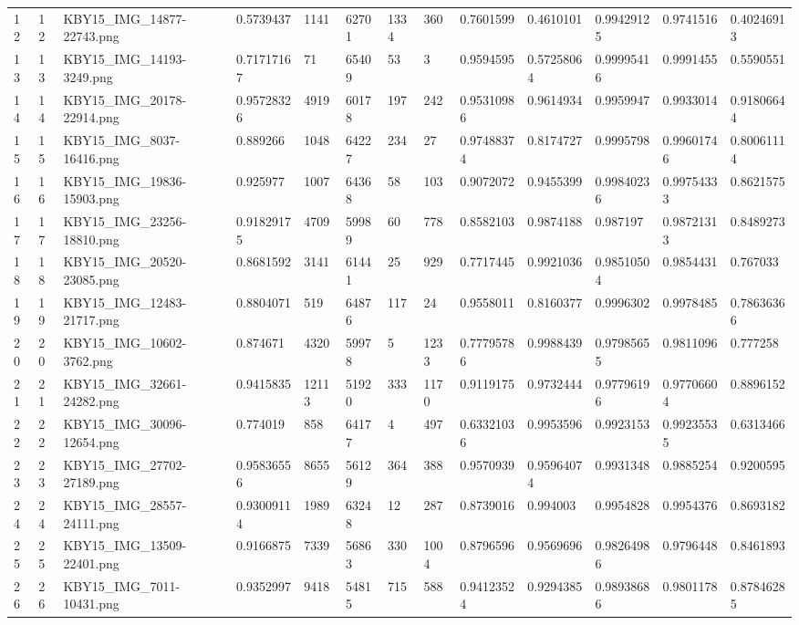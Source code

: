 \documentclass[11pt, a4paper, twoside]{report}
\begin{document}
\begin{longtable}[c]{@{}lllllllllllll@{}}
12 & 12 & KBY15\_IMG\_14877-22743.png & 0.5739437 & 1141 & 62701 & 1334 & 360 & 0.7601599 & 0.4610101 & 0.99429125 & 0.9741516 & 0.40246913 \\
13 & 13 & KBY15\_IMG\_14193-3249.png & 0.71717167 & 71 & 65409 & 53 & 3 & 0.9594595 & 0.57258064 & 0.99995416 & 0.9991455 & 0.5590551 \\
14 & 14 & KBY15\_IMG\_20178-22914.png & 0.95728326 & 4919 & 60178 & 197 & 242 & 0.95310986 & 0.9614934 & 0.9959947 & 0.9933014 & 0.91806644 \\
15 & 15 & KBY15\_IMG\_8037-16416.png & 0.889266 & 1048 & 64227 & 234 & 27 & 0.97488374 & 0.8174727 & 0.9995798 & 0.99601746 & 0.80061114 \\
16 & 16 & KBY15\_IMG\_19836-15903.png & 0.925977 & 1007 & 64368 & 58 & 103 & 0.9072072 & 0.9455399 & 0.99840236 & 0.99754333 & 0.8621575 \\
17 & 17 & KBY15\_IMG\_23256-18810.png & 0.91829175 & 4709 & 59989 & 60 & 778 & 0.8582103 & 0.9874188 & 0.987197 & 0.98721313 & 0.8489273 \\
18 & 18 & KBY15\_IMG\_20520-23085.png & 0.8681592 & 3141 & 61441 & 25 & 929 & 0.7717445 & 0.9921036 & 0.98510504 & 0.9854431 & 0.767033 \\
19 & 19 & KBY15\_IMG\_12483-21717.png & 0.8804071 & 519 & 64876 & 117 & 24 & 0.9558011 & 0.8160377 & 0.9996302 & 0.9978485 & 0.78636366 \\
20 & 20 & KBY15\_IMG\_10602-3762.png & 0.874671 & 4320 & 59978 & 5 & 1233 & 0.77795786 & 0.9988439 & 0.97985655 & 0.9811096 & 0.777258 \\
21 & 21 & KBY15\_IMG\_32661-24282.png & 0.9415835 & 12113 & 51920 & 333 & 1170 & 0.9119175 & 0.9732444 & 0.97796196 & 0.97706604 & 0.8896152 \\
22 & 22 & KBY15\_IMG\_30096-12654.png & 0.774019 & 858 & 64177 & 4 & 497 & 0.63321036 & 0.9953596 & 0.9923153 & 0.99235535 & 0.6313466 \\
23 & 23 & KBY15\_IMG\_27702-27189.png & 0.95836556 & 8655 & 56129 & 364 & 388 & 0.9570939 & 0.95964074 & 0.9931348 & 0.9885254 & 0.9200595 \\
24 & 24 & KBY15\_IMG\_28557-24111.png & 0.93009114 & 1989 & 63248 & 12 & 287 & 0.8739016 & 0.994003 & 0.9954828 & 0.9954376 & 0.8693182 \\
25 & 25 & KBY15\_IMG\_13509-22401.png & 0.9166875 & 7339 & 56863 & 330 & 1004 & 0.8796596 & 0.9569696 & 0.98264986 & 0.9796448 & 0.8461893 \\
26 & 26 & KBY15\_IMG\_7011-10431.png & 0.9352997 & 9418 & 54815 & 715 & 588 & 0.94123524 & 0.9294385 & 0.98938686 & 0.9801178 & 0.87846285 \\

\end{longtable}
\end{document}
